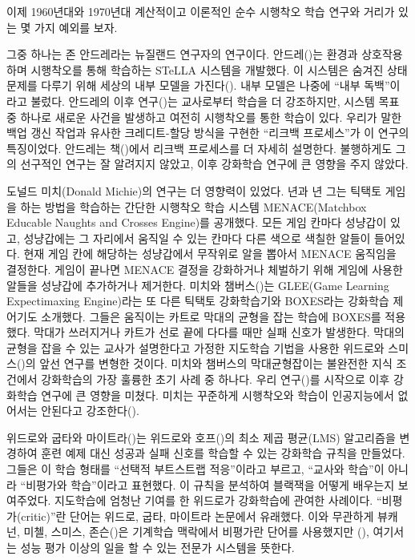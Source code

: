 이제 1960년대와 1970년대 계산적이고 이론적인 순수 시행착오 학습 연구와 거리가
있는 몇 가지 예외를 보자.

그중 하나는 존 안드레라는 뉴질랜드 연구자의 연구이다.
안드레(\cite{Andreae1963})는 환경과 상호작용하며 시행착오를 통해 학습하는 STeLLA
시스템을 개발했다. 이 시스템은 숨겨진 상태 문제를 다루기 위해 세상의 내부 모델을
가진다(\cite{Andreae1969a}). 내부 모델은 나중에 ``내부 독백''이라고 불렀다.
안드레의 이후 연구(\cite*{Andreae1977})는 교사로부터 학습을 더 강조하지만,
시스템 목표 중 하나로 새로운 사건을 발생하고 여전히 시행착오를 통한 학습이 있다.
우리가 말한 백업 갱신 작업과 유사한 크레디트-할당 방식을 구현한 ``리크백
프로세스''가 이 연구의 특징이었다. 안드레는 책(\cite*{Andreae1998})에서 리크백
프로세스를 더 자세히 설명한다.
불행하게도 그의 선구적인 연구는 잘 알려지지 않았고,
이후 강화학습 연구에 큰 영향을 주지 않았다.

도널드 미치(Donald Michie)의 연구는 더 영향력이 있었다. \cite*{Michie1961}년과
\cite*{Michie1963}년 그는 틱택토 게임을 하는 방법을 학습하는 간단한 시행착오
학습 시스템 MENACE(Matchbox Educable Naughts and Crosses Engine)를 공개했다.
모든 게임 칸마다 성냥갑이 있고, 성냥갑에는 그 자리에서 움직일 수 있는 칸마다
다른 색으로 색칠한 알들이 들어있다. 현재 게임 칸에 해당하는 성냥갑에서 무작위로
알을 뽑아서 MENACE 움직임을 결정한다. 게임이 끝나면 MENACE 결정을 강화하거나
체벌하기 위해 게임에 사용한 알들을 성냥갑에 추가하거나 제거한다. 미치와
챔버스(\cite{MichieChambers1968})는 GLEE(Game Learning Expectimaxing Engine)라는
또 다른 틱택토 강화학습기와 BOXES라는 강화학습 제어기도 소개했다. 그들은
움직이는 카트로 막대의 균형을 잡는 학습에 BOXES를 적용했다. 막대가 쓰러지거나
카트가 선로 끝에 다다를 때만 실패 신호가 발생한다. 막대의 균형을 잡을 수 있는
교사가 설명한다고 가정한 지도학습 기법을 사용한 위드로와
스미스(\cite{WidrowSmith1964})의 앞선 연구를 변형한 것이다. 미치와 챔버스의
막대균형잡이는 불완전한 지식 조건에서 강화학습의 가장 훌륭한 초기 사례 중
하나다. 우리 연구(\cite{BartoSuttonAnderson1983, Sutton1984})를 시작으로 이후
강화학습 연구에 큰 영향을 미쳤다. 미치는 꾸준하게 시행착오와 학습이 인공지능에서
없어서는 안된다고 강조한다(\cite{Michie1974}).

위드로와 굽타와 마이트라(\cite{WidrowGuptaMaitra1973})는 위드로와
호프(\cite{WidrowHoff1960})의 최소 제곱 평균(LMS) 알고리즘을 변경하여 훈련 예제
대신 성공과 실패 신호를 학습할 수 있는 강화학습 규칙을 만들었다. 그들은 이 학습
형태를 ``선택적 부트스트랩 적응''이라고 부르고, ``교사와 학습''이 아니라
``비평가와 학습''이라고 표현했다. 이 규칙을 분석하여 블랙잭을 어떻게 배우는지
보여주었다. 지도학습에 엄청난 기여를 한 위드로가 강화학습에 관여한 사례이다.
``비평가(critic)''란 단어는 위드로, 굽타, 마이트라 논문에서 유래했다. 이와
무관하게 뷰캐넌, 미첼, 스미스, 존슨(\cite{BuchananMitchellSmithJohnson1978})은
기계학습 맥락에서 비평가란 단어를 사용했지만
(\cite[또,][참고]{DietterichBuchanan1984}), 여기서는 성능 평가 이상의 일을 할 수
있는 전문가 시스템을 뜻한다.

